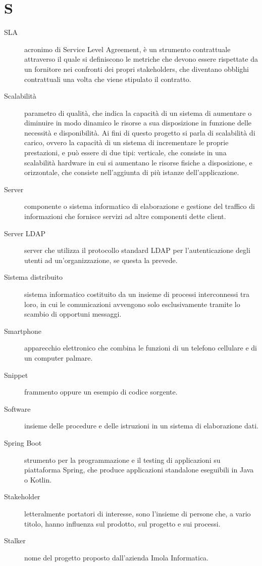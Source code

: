 \documentclass{article}
\begin{document}
\section{S}
\begin{description}
  \item[SLA] acronimo di Service Level Agreement, è un strumento contrattuale attraverso il quale si definiscono le metriche che devono essere rispettate da un fornitore nei confronti dei propri stakeholders, che diventano obblighi contrattuali una volta che viene stipulato il contratto.
  \item[Scalabilità] parametro di qualità, che indica la capacità di un sistema di aumentare o diminuire in modo dinamico le risorse a sua disposizione in funzione delle necessità e disponibilità. Ai fini di questo progetto si parla di scalabilità di carico, ovvero la capacità di un sistema di incrementare le proprie prestazioni, e può essere di due tipi: verticale, che consiste in una scalabilità hardware in cui si aumentano le risorse fisiche a disposizione, e orizzontale, che consiste nell'aggiunta di più istanze dell'applicazione.
  \item[Server] componente o sistema informatico di elaborazione e gestione del traffico di informazioni che fornisce servizi ad altre componenti dette client.
  \item[Server LDAP] server che utilizza il protocollo standard LDAP per l'autenticazione degli utenti ad un'organizzazione, se questa la prevede.
  \item[Sistema distribuito] sistema informatico costituito da un insieme di processi interconnessi tra loro, in cui le comunicazioni avvengono solo esclusivamente tramite lo scambio di opportuni messaggi.
  \item[Smartphone] apparecchio elettronico che combina le funzioni di un telefono cellulare e di un computer palmare.
  \item[Snippet] frammento oppure un esempio di codice sorgente.
  \item[Software] insieme delle procedure e delle istruzioni in un sistema di elaborazione dati.
  \item[Spring Boot] strumento per la programmazione e il testing di applicazioni su piattaforma Spring, che produce applicazioni standalone eseguibili in Java o Kotlin.
  \item[Stakeholder] letteralmente portatori di interesse, sono l'insieme di persone che, a vario titolo, hanno influenza sul prodotto, sul progetto e sui processi.
  \item[Stalker] nome del progetto proposto dall'azienda Imola Informatica.

\end{description}
\end{document}
